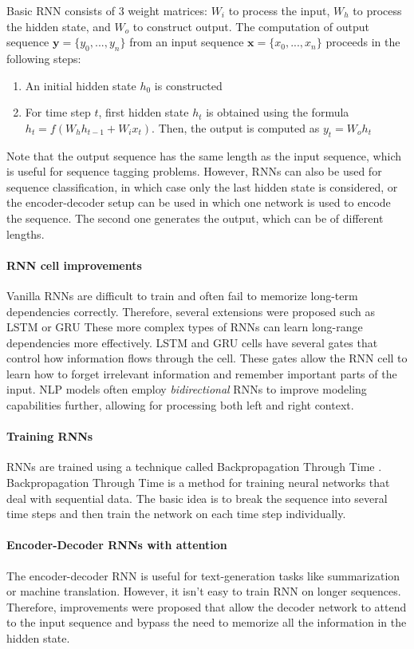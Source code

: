 Basic RNN consists of 3 weight matrices: $W_{i}$ to process the input, $W_h$ to process the hidden state, and $W_o$ to construct output.
The computation of output sequence $\mathbf{y} = \{y_0, ..., y_n\}$ from an input sequence $\mathbf{x} = \{x_0, ..., x_n\}$ proceeds in the following steps:
\begin{enumerate}
    \item An initial hidden state $h_0$ is constructed
    \item For time step $t$, first hidden state $h_t$ is obtained using the formula $h_t = f(W_hh_{t-1} + W_ix_t)$. Then, the output is computed as $y_t = W_oh_t$
\end{enumerate}
Note that the output sequence has the same length as the input sequence, which is useful for sequence tagging problems.
However, RNNs can also be used for sequence classification, in which case only the last hidden state is considered, or the encoder-decoder setup can be used in which one network is used to encode the sequence.
The second one generates the output, which can be of different lengths.

\paragraph{RNN cell improvements}
Vanilla RNNs are difficult to train and often fail to memorize long-term dependencies correctly.
Therefore, several extensions were proposed such as LSTM \cite{hochreiter1997} or GRU \cite{cho-etal-2014-properties}
These more complex types of RNNs can learn long-range dependencies more effectively.
LSTM and GRU cells have several gates that control how information flows through the cell.
These gates allow the RNN cell to learn how to forget irrelevant information and remember important parts of the input.
NLP models often employ \emph{bidirectional} RNNs to improve modeling capabilities further, allowing for processing both left and right context.

\paragraph{Training RNNs}
RNNs are trained using a technique called Backpropagation Through Time \cite{werbos1990backpropagation}.
Backpropagation Through Time is a method for training neural networks that deal with sequential data.
The basic idea is to break the sequence into several time steps and then train the network on each time step individually.

\paragraph{Encoder-Decoder RNNs with attention}
The encoder-decoder RNN is useful for text-generation tasks like summarization or machine translation.
However, it isn't easy to train RNN on longer sequences.
Therefore, improvements were proposed \cite{bahdanau2014neural,luong-etal-2015-effective} that allow the decoder network to attend to the input sequence and bypass the need to memorize all the information in the hidden state.

